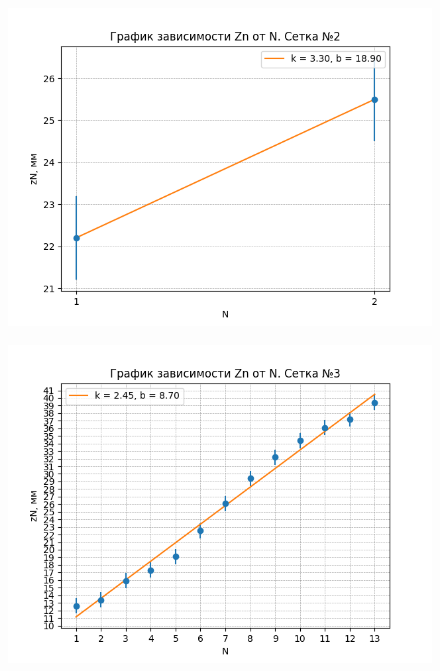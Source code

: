 \documentclass[a4paper,12pt]{article}
\begin{document}
\begin{figure}[H]
\centering
\includegraphics[scale=0.65]{2.png}

\end{figure}

\begin{figure}[H]
\centering
\includegraphics[scale=1]{3.png}

\end{figure}
\end{document}
